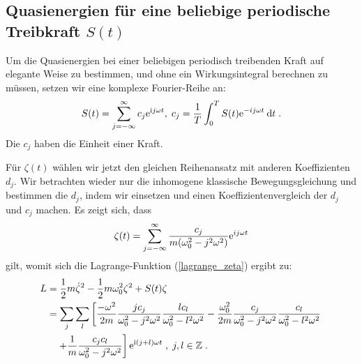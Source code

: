     \subsection{Quasienergien für eine beliebige periodische Treibkraft $S(t)$}
      \label{epsilon_bel_kraft}
      Um die Quasienergien bei einer beliebigen periodisch treibenden Kraft auf elegante Weise zu bestimmen, und ohne ein Wirkungsintegral berechnen zu müssen, setzen wir eine komplexe Fourier-Reihe an:
      \begin{equation}
        S(t) = \sum_{j=-\infty}^\infty c_j \text e^{\text ij\omega t}, \; c_j = \frac{1}{T} \int_0^T S(t) \text e^{-ij\omega t} \: \text d t \; .
      \end{equation}
      Die $c_j$ haben die Einheit einer Kraft.
\iffalse
      Für $\zeta(t)$ wählen wir jetzt ebenfalls einen Reihenansatz:
      \begin{equation}
        \zeta(t) = \sum_{j=-\infty}^\infty d_j \text e^{\text ij\omega t} \; .
      \end{equation}
\fi
      Für $\zeta(t)$ wählen wir jetzt den gleichen Reihenansatz mit anderen Koeffizienten $d_j$.
      Wir betrachten wieder nur die inhomogene klassische Bewegungsgleichung und bestimmen die $d_j$, indem wir einsetzen und einen Koeffizientenvergleich der $d_j$ und $c_j$ machen.
      Es zeigt sich, dass
      \begin{equation}
        \zeta(t) = \sum_{j=-\infty}^\infty \frac{c_j}{m(\omega_0^2-j^2\omega^2)} \text e^{ij\omega t}
        \label{zeta_bel_kraft}
      \end{equation}
      gilt, womit sich die Lagrange-Funktion (\ref{lagrange_zeta}) ergibt zu:
      \begin{align}
        \begin{split}
          L &= \frac{1}{2}m\dot \zeta^2 - \frac{1}{2}m\omega_0^2\zeta^2 + S(t)\zeta \notag\\
           &=\sum_j \sum_l \left[ \frac{-\omega^2}{2m} \frac{jc_j}{\omega_0^2-j^2\omega^2} \frac{lc_l}{\omega_0^2-l^2\omega^2}
           -\frac{\omega_0^2}{2m} \frac{c_j}{\omega_0^2-j^2\omega^2} \frac{c_l}{\omega_0^2-l^2\omega^2} \right. \notag\\
            &\left. \quad + \frac{1}{m} \frac{c_jc_l}{\omega_0^2-j^2\omega^2} \right] \text e^{\text i(j+l)\omega t}  \; , \; j,l \in \mathbb{Z} \; .
         \end{split}
       \end{align}
      \iffalse
